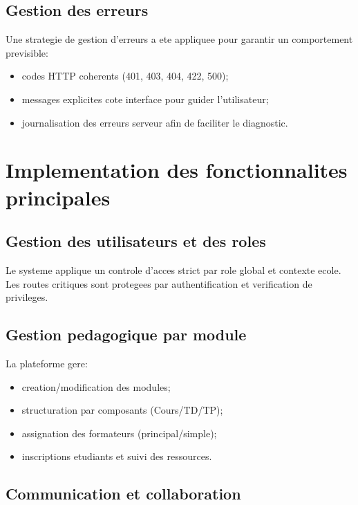 ﻿\documentclass[12pt,a4paper,oneside]{report}
\begin{document}
\subsection{Gestion des erreurs}

Une strategie de gestion d'erreurs a ete appliquee pour garantir un comportement previsible:
\begin{itemize}
  \item codes HTTP coherents (401, 403, 404, 422, 500);
  \item messages explicites cote interface pour guider l'utilisateur;
  \item journalisation des erreurs serveur afin de faciliter le diagnostic.
\end{itemize}

\section{Implementation des fonctionnalites principales}

\subsection{Gestion des utilisateurs et des roles}

Le systeme applique un controle d'acces strict par role global et contexte ecole. Les routes critiques sont protegees par authentification et verification de privileges.

\subsection{Gestion pedagogique par module}

La plateforme gere:
\begin{itemize}
  \item creation/modification des modules;
  \item structuration par composants (Cours/TD/TP);
  \item assignation des formateurs (principal/simple);
  \item inscriptions etudiants et suivi des ressources.
\end{itemize}

\subsection{Communication et collaboration}
\end{document}

